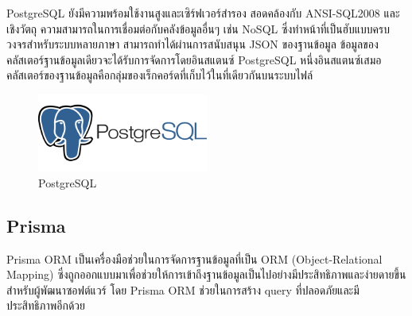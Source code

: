 PostgreSQL ยังมีความพร้อมใช้งานสูงและเซิร์ฟเวอร์สำรอง สอดคล้องกับ ANSI-SQL2008 และเชิงวัตถุ ความสามารถในการเชื่อมต่อกับคลังข้อมูลอื่นๆ เช่น NoSQL ซึ่งทำหน้าที่เป็นฮับแบบครบวงจรสำหรับระบบหลายภาษา สามารถทำได้ผ่านการสนับสนุน JSON ของฐานข้อมูล ข้อมูลของคลัสเตอร์ฐานข้อมูลเดียวจะได้รับการจัดการโดยอินสแตนซ์ PostgreSQL หนึ่งอินสแตนซ์เสมอ คลัสเตอร์ของฐานข้อมูลคือกลุ่มของเร็กคอร์ดที่เก็บไว้ในที่เดียวกันบนระบบไฟล์
\begin{figure}
    \centering
    \includegraphics[width=0.5\textwidth]{img/postgresql.png}
    \caption{PostgreSQL}
    \label{fig:postgresql}
\end{figure}

\subsection{Prisma}
Prisma ORM \cite{web:prisma} เป็นเครื่องมือช่วยในการจัดการฐานข้อมูลที่เป็น ORM (Object-Relational Mapping) ซึ่งถูกออกแบบมาเพื่อช่วยให้การเข้าถึงฐานข้อมูลเป็นไปอย่างมีประสิทธิภาพและง่ายดายขึ้นสำหรับผู้พัฒนาซอฟต์แวร์ โดย Prisma ORM ช่วยในการสร้าง query ที่ปลอดภัยและมีประสิทธิภาพอีกด้วย


